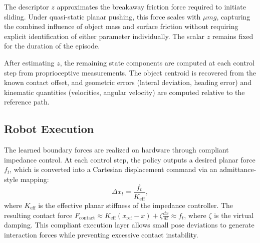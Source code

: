The descriptor $z$ approximates the breakaway friction force required to initiate sliding. Under quasi-static planar pushing, this force scales with $\mu m g$, capturing the combined influence of object mass and surface friction without requiring explicit identification of either parameter individually. The scalar $z$ remains fixed for the duration of the episode.

After estimating $z$, the remaining state components are computed at each control step from proprioceptive measurements. The object centroid is recovered from the known contact offset, and geometric errors (lateral deviation, heading error) and kinematic quantities (velocities, angular velocity) are computed relative to the reference path.


\subsection{Robot Execution}
\label{sec:pho_execution}

The learned boundary forces are realized on hardware through compliant impedance control. At each control step, the policy outputs a desired planar force $f_t$, which is converted into a Cartesian displacement command via an admittance-style mapping:
\[
\Delta x_t = \frac{f_t}{K_\text{eff}},
\]
where $K_\text{eff}$ is the effective planar stiffness of the impedance controller. The resulting contact force $F_\text{contact} \approx K_\text{eff}(x_\text{ref} - x) + \zeta \frac{dx}{dt} \approx f_t$, where $\zeta$ is the virtual damping. This compliant execution layer allows small pose deviations to generate interaction forces while preventing excessive contact instability.

